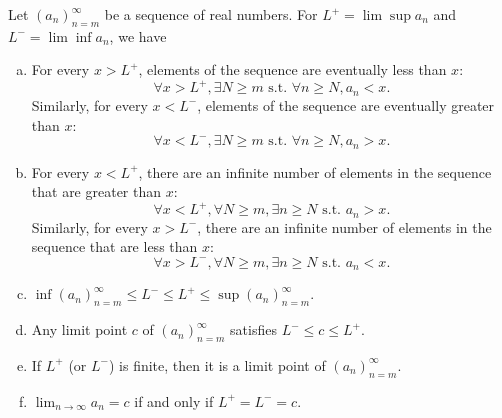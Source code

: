 \begin{lem}
  \label{lem:qualitiesAboutLimitSuperiorAndInferior}
  Let $(a_n)_{n=m}^{\infty}$ be a sequence of real numbers.
  For $L^+=\lim\sup a_n$ and $L^-=\lim\inf a_n$,
  we have
  \begin{enumerate}[(a)]
  \item For every $x>L^+$,
    elements of the sequence are eventually less than $x$:
    \begin{displaymath}
      \forall x>L^+, \exists N\ge m \text{ s.t. }
      \forall n\ge N, a_n<x.
    \end{displaymath}
    Similarly, for every $x<L^-$,
    elements of the sequence are eventually greater than $x$:
    \begin{displaymath}
      \forall x<L^-, \exists N\ge m \text{ s.t. }
      \forall n\ge N, a_n>x.
    \end{displaymath}
  \item For every $x<L^+$,
    there are an infinite number of elements in the sequence
    that are greater than $x$:
    \begin{displaymath}
      \forall x<L^+, \forall N\ge m,
      \exists n\ge N \text{ s.t. } a_n>x.
    \end{displaymath}
    Similarly,
    for every $x>L^-$,
    there are an infinite number of elements in the sequence
    that are less than $x$:
    \begin{displaymath}
      \forall x>L^-, \forall N\ge m,
      \exists n\ge N \text{ s.t. } a_n < x.
    \end{displaymath}
  \item $\inf(a_n)_{n=m}^{\infty}\le L^- \le L^+ \le
    \sup(a_n)_{n=m}^{\infty}$.
  \item Any limit point $c$ of $(a_n)_{n=m}^{\infty}$
    satisfies $L^-\le c \le L^+$.
  \item If $L^+$ (or $L^-$) is finite,
    then it is a limit point
    of $(a_n)_{n=m}^{\infty}$.
  \item $\lim_{n\rightarrow \infty} a_n = c$
    if and only if $L^+=L^-=c$.
    
  \end{enumerate}
\end{lem}
